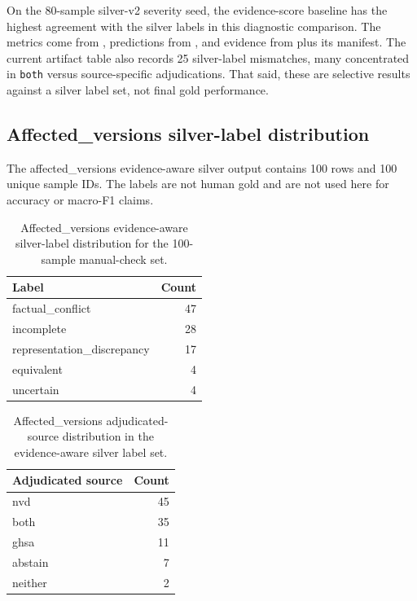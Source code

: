 On the 80-sample silver-v2 severity seed, the evidence-score baseline has the highest agreement with the silver labels in this diagnostic comparison. The metrics come from , predictions from , and evidence from  plus its manifest. The current artifact table also records 25 silver-label mismatches, many concentrated in \texttt{both} versus source-specific adjudications. That said, these are selective results against a silver label set, not final gold performance.

\subsection{Affected\_versions silver-label distribution}

The affected\_versions evidence-aware silver output contains 100 rows and 100 unique sample IDs. The labels are not human gold and are not used here for accuracy or macro-F1 claims.

\begin{table}[!htbp]
\centering
\caption{Affected\_versions evidence-aware silver-label distribution for the 100-sample manual-check set.}
\label{tab:05-results-affected-versions-silver-label-distribution-1}
\begin{tabular}{lr}
\toprule
Label & Count \\
\midrule
factual\_conflict & 47 \\
incomplete & 28 \\
representation\_discrepancy & 17 \\
equivalent & 4 \\
uncertain & 4 \\
\bottomrule
\end{tabular}
\end{table}

\begin{table}[!htbp]
\centering
\caption{Affected\_versions adjudicated-source distribution in the evidence-aware silver label set.}
\label{tab:05-results-affected-versions-silver-label-distribution-2}
\begin{tabular}{lr}
\toprule
Adjudicated source & Count \\
\midrule
nvd & 45 \\
both & 35 \\
ghsa & 11 \\
abstain & 7 \\
neither & 2 \\
\bottomrule
\end{tabular}
\end{table}

